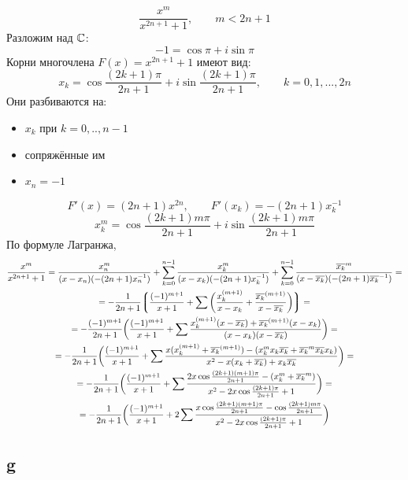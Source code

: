 $$ \frac{x^m}{x^{2n + 1} + 1}, \qquad m < 2n + 1 $$
Разложим над $ \mathbb{C} $:
$$ -1 = \cos \pi + i \sin \pi $$
Корни многочлена $ F(x) = x^{2n + 1} + 1 $ имеют вид:
$$ x_k = \cos \frac{(2k + 1)\pi}{2n + 1} + i \sin \frac{(2k + 1)\pi}{2n + 1}, \qquad k = 0, 1, ..., 2n $$
Они разбиваются на:
\begin{itemize}
	\item $ x_k $ при $ k = 0, .., n - 1 $
    \item сопряжённые им
    \item $ x_n = -1 $
\end{itemize}
$$ F'(x) = (2n + 1)x^{2n}, \qquad F'(x_k) = -(2n + 1)x_k^{-1} $$
$$ x_k^m = \cos \frac{(2k + 1)m\pi}{2n + 1} + i \sin \frac{(2k + 1)m\pi}{2n + 1} $$
По формуле Лагранжа,
\begin{multline*}
    \frac{x^m}{x^{2n + 1} + 1} = \frac{x_n^m}{(x - x_n)(-(2n + 1)x_n^{-1})} + \sum_{k = 0}^{n - 1} \frac{x_k^m}{(x - x_k)(-(2n + 1)x_k^{-1})} + \sum_{k = 0}^{n - 1} \frac{\overline{x_k}^m}{(x - \overline{x_k})(-(2n + 1)\overline{x_k}^{-1})} = \\
    = -\frac1{2n + 1} \bigg\lgroup \frac{(-1)^{m + 1}}{x + 1} + \sum \bigg( \frac{x_k^{(m + 1)}}{x - x_k} + \frac{\overline{x_k}^{(m + 1)}}{x - \overline{x_k}} \bigg) \bigg\rgroup = \\
    = -\frac{(-1)^{m + 1}}{2n + 1} \bigg( \frac{(-1)^{m + 1}}{x + 1} + \sum \frac{x_k^{(m + 1)}(x - \overline{x_k}) + \overline{x_k}^{(m + 1)}(x - x_k)}{(x - x_k)(x - \overline{x_k})} \bigg) = \\
    = -\frac1{2n + 1} \bigg( \frac{(-1)^{m + 1}}{x + 1} + \sum \frac{x(x_k^{(m + 1)} + \overline{x_k}^{(m + 1)}) - (x_k^mx_k\overline{x_k} + \overline{x_k}^m\overline{x_k}x_k)}{x^2 - x(x_k + \overline{x_k}) + x_k\overline{x_k}} \bigg) = \\
    = -\frac1{2n + 1} \bigg( \frac{(-1)^{m + 1}}{x + 1} + \sum \frac{2x\cos \frac{(2k + 1)(m + 1)\pi}{2n + 1} - (x_k^m + \overline{x_k}^m)}{x^2 - 2x\cos \frac{(2k + 1)\pi}{2n + 1} + 1} \bigg) = \\
    = -\frac1{2n + 1} \bigg( \frac{(-1)^{m + 1}}{x + 1} + 2\sum \frac{x\cos \frac{(2k + 1)(m + 1)\pi}{2n + 1} - \cos \frac{(2k + 1)m\pi}{2n + 1}}{x^2 - 2x\cos \frac{(2k + 1)\pi}{2n + 1} + 1} \bigg)
\end{multline*}

\subsection{g}

